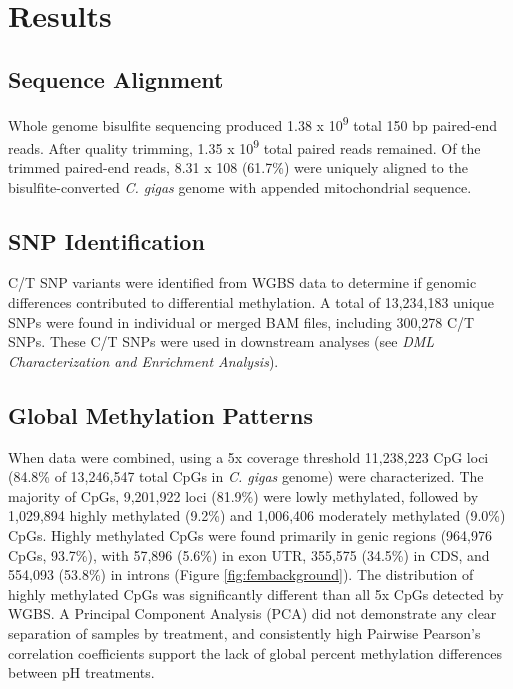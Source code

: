 \documentclass [11pt, proquest] {uwthesis}[2015/03/03]
\begin{document}
\hypertarget{results-2}{%
\section{Results}\label{results-2}}

\hypertarget{sequence-alignment-1}{%
\subsection{Sequence Alignment}\label{sequence-alignment-1}}

Whole genome bisulfite sequencing produced 1.38 x 10\textsuperscript{9} total 150 bp paired-end reads. After quality trimming, 1.35 x 10\textsuperscript{9} total paired reads remained. Of the trimmed paired-end reads, 8.31 x 108 (61.7\%) were uniquely aligned to the bisulfite-converted \emph{C. gigas} genome with appended mitochondrial sequence.

\hypertarget{snp-identification-1}{%
\subsection{SNP Identification}\label{snp-identification-1}}

C/T SNP variants were identified from WGBS data to determine if genomic differences contributed to differential methylation. A total of 13,234,183 unique SNPs were found in individual or merged BAM files, including 300,278 C/T SNPs. These C/T SNPs were used in downstream analyses (see \emph{DML Characterization and Enrichment Analysis}).

\hypertarget{global-methylation-patterns}{%
\subsection{Global Methylation Patterns}\label{global-methylation-patterns}}

When data were combined, using a 5x coverage threshold 11,238,223 CpG loci (84.8\% of 13,246,547 total CpGs in \emph{C. gigas} genome) were characterized. The majority of CpGs, 9,201,922 loci (81.9\%) were lowly methylated, followed by 1,029,894 highly methylated (9.2\%) and 1,006,406 moderately methylated (9.0\%) CpGs. Highly methylated CpGs were found primarily in genic regions (964,976 CpGs, 93.7\%), with 57,896 (5.6\%) in exon UTR, 355,575 (34.5\%) in CDS, and 554,093 (53.8\%) in introns (Figure \ref{fig:fembackground}). The distribution of highly methylated CpGs was significantly different than all 5x CpGs detected by WGBS. A Principal Component Analysis (PCA) did not demonstrate any clear separation of samples by treatment, and consistently high Pairwise Pearson's correlation coefficients support the lack of global percent methylation differences between pH treatments.
\end{document}
